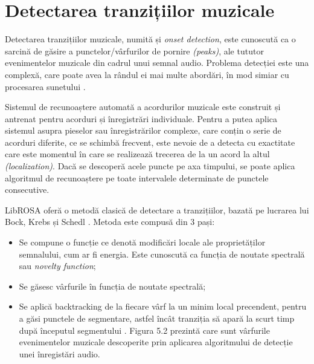 \documentclass[a4paper,12pt]{report}
\begin{document}

\newpage
\section{Detectarea tranzițiilor muzicale}
Detectarea tranzițiilor muzicale, numită și \emph{onset detection}, este 
cunoscută ca o sarcină de găsire a punctelor/vârfurilor de pornire \emph{(peaks)},
ale tututor evenimentelor muzicale din cadrul unui semnal audio.
Problema detecției este una complexă, care poate avea la rândul 
ei mai multe abordări, în mod simiar cu procesarea sunetului \cite{WEBSITE:onset-detection}. 

Sistemul de recunoaștere automată a acordurilor muzicale 
este construit și antrenat pentru acorduri și înregistrări 
individuale. Pentru a putea aplica sistemul asupra pieselor 
sau înregistrărilor complexe, care conțin o serie de acorduri 
diferite, ce se schimbă frecvent, este nevoie de a detecta cu 
exactitate care este momentul în care se realizează trecerea 
de la un acord la altul \emph{(localization)}. Dacă se 
descoperă acele puncte pe axa timpului, se poate aplica 
algoritmul de recunoaștere pe toate intervalele determinate 
de punctele consecutive.

LibROSA oferă o metodă clasică de detectare a tranzițiilor, bazată 
pe lucrarea lui Bock, Krebs și Schedl \cite{Evaluating-the-online-capabilities-of-Onset-detection-methods}. Metoda este compusă 
din 3 pași:
\begin{itemize}
    \item Se compune o funcție ce denotă modificări locale ale proprietăților 
semnalului, cum ar fi energia. Este cunoscută ca funcția de noutate spectrală sau 
\emph{novelty function};
    \item Se găsesc vârfurile în funcția de noutate spectrală;
    \item Se aplică backtracking de la fiecare vârf la un minim local precendent, pentru 
a găsi punctele de segmentare, astfel încât tranziția să apară la scurt timp după 
începutul segmentului \cite{WEBSITE:onset-detection}. Figura 5.2 prezintă care sunt 
vârfurile evenimentelor muzicale descoperite prin aplicarea algoritmului de detecție unei înregistări audio.
\end{itemize}
\end{document}
